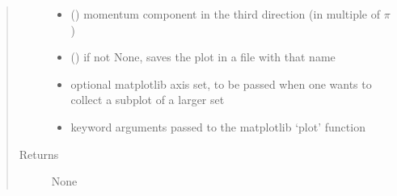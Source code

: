 \documentclass[letterpaper,10pt,english]{sphinxmanual}
\begin{document}
\begin{fulllineitems}
\begin{quote}
\begin{description}
\begin{itemize}
\item {} 
\sphinxAtStartPar
{} () \textendash{} momentum component in the third direction (in multiple of \(\pi\))

\item {} 
\sphinxAtStartPar
{} () \textendash{} if not None, saves the plot in a file with that name

\item {} 
\sphinxAtStartPar
{} \textendash{} optional matplotlib axis set, to be passed when one wants to collect a subplot of a larger set

\item {} 
\sphinxAtStartPar
{} \textendash{} keyword arguments passed to the matplotlib ‘plot’ function

\end{itemize}

\item[{Returns}] \leavevmode
\sphinxAtStartPar
None

\end{description}\end{quote}

\end{fulllineitems}

\end{document}
